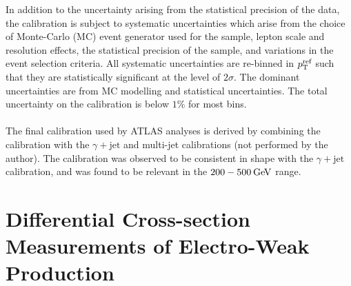 \documentclass{thesissummary}
\begin{document}
In addition to the uncertainty arising from the statistical precision of the data, the calibration is subject to systematic uncertainties which arise from the choice of Monte-Carlo (MC) event generator used for the \zjet sample, lepton scale and resolution effects, the statistical precision of the \zjet sample, and variations in the event selection criteria. All systematic uncertainties are re-binned in $p_{\text{T}}^{\text{ref}}$ such that they are statistically significant at the level of $2\sigma$. The dominant uncertainties are from MC modelling and statistical uncertainties. The total uncertainty on the calibration is below $1\%$ for most bins.
\\\\
The final calibration used by ATLAS analyses is derived by combining the \zjet calibration with the $\gamma+\text{jet}$ and multi-jet calibrations (not performed by the author). The \zjet calibration was observed to be consistent in shape with the $\gamma+\text{jet}$ calibration, and was found to be relevant in the $200-500\hspace{2pt}\text{Ge\kern -0.1em V}$ range.

\section{Differential Cross-section Measurements of Electro-Weak \wyjj Production}
\end{document}
